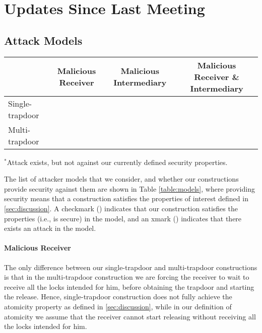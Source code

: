 \section{Updates Since Last Meeting}

\subsection{Attack Models}
\label{sec:attackermodels}

\begin{table*}[htb]
	\centering
	\begin{tabular}{|l|c|c|c|} \hline
		&	Malicious Receiver	&	Malicious Intermediary	&	Malicious Receiver \& Intermediary \\ \hline
		Single-trapdoor & \xmark & \xmark{$^*$} & \xmark \\ \hline
		Multi-trapdoor 	& \cmark & \cmark & \cmark \\ \hline
	\end{tabular}
	
	{\footnotesize $^*$Attack exists, but not against our currently defined security properties.}
	\caption{Attack models against our constructions.}
	\label{table:models}
\end{table*}

The list of attacker models that we consider, and whether our constructions provide security 
against them are shown in Table \ref{table:models}, where providing security means that 
a construction satisfies the properties of interest defined in \cref{sec:discussion}. 
A checkmark (\cmark) indicates that our construction satisfies the properties (i.e., is secure) 
in the model, and an xmark (\xmark) indicates that there exists an attack in the model.

\paragraph{Malicious Receiver} The only difference between our single-trapdoor and 
multi-trapdoor constructions is that in the multi-trapdoor construction we are forcing 
the receiver to wait to receive all the locks intended for him, before obtaining the 
trapdoor and starting the release. Hence, single-trapdoor construction does not fully 
achieve the atomicity property as defined in \cref{sec:discussion}, while in our definition 
of atomicity we assume that the receiver cannot start releasing without receiving all the 
locks intended for him.


